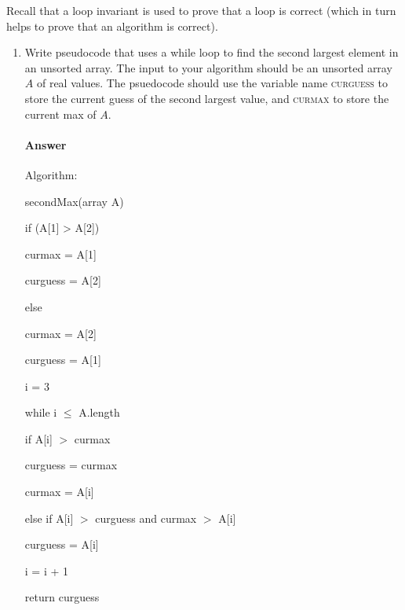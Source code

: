 \documentclass{article}
\begin{document}
 

Recall that a loop invariant is used to prove that a loop is correct (which in
turn helps to prove that an algorithm is correct).

\begin{enumerate}

    \item Write pseudocode that uses a while loop to find the second largest
        element in an unsorted array.  The input to your algorithm should be an
        unsorted array $A$ of real values.  The psuedocode should use the
        variable name \textsc{curguess} to store the current guess of the second
        largest value, and \textsc{curmax} to store the current max of $A$.

        \paragraph{Answer} Algorithm:

        secondMax(array A)
        
        \qquad if (A[1] > A[2])
        
        \qquad \qquad curmax = A[1]
       
        \qquad \qquad curguess = A[2]
        
        \qquad else 
       
        \qquad \qquad curmax = A[2]
       
        \qquad \qquad curguess = A[1]
        
        \qquad i = 3
       
        \qquad while i $\leq$ A.length
       
        \qquad \qquad if A[i] $>$ curmax
       
        \qquad \qquad \qquad curguess = curmax
       
        \qquad \qquad \qquad curmax = A[i]
        
        \qquad \qquad else if A[i] $>$ curguess and curmax $>$ A[i]
        
        \qquad \qquad \qquad curguess = A[i]
        
        \qquad \qquad i = i + 1
        
        \qquad return curguess
        


\end{enumerate}
\end{document}
